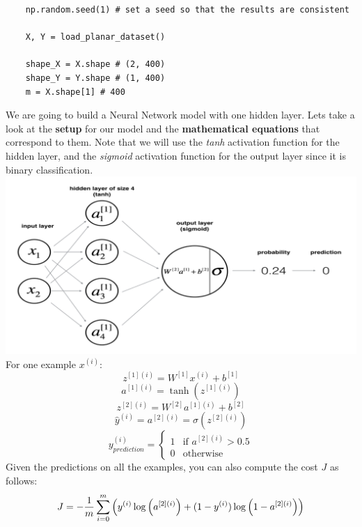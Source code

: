 \documentclass[11pt, a4paper]{article}
\begin{document}
\begin{spacing}{1.1}
\begin{lstlisting}
	np.random.seed(1) # set a seed so that the results are consistent
	
	X, Y = load_planar_dataset()

	shape_X = X.shape # (2, 400)
	shape_Y = Y.shape # (1, 400)
	m = X.shape[1] # 400 \end{lstlisting}
	We are going to build a Neural Network model with one hidden layer. Lets take a look at the \textbf{setup} for our model and the \textbf{mathematical equations} that correspond to them. Note that we will use the \textit{tanh} activation function for the hidden layer, and the \textit{sigmoid} activation function for the output layer since it is binary classification. \\
	\hspace*{27mm} \includegraphics[scale=0.55]{planar_nn} \vspace*{1mm} \\
	For one example $x^{(i)}$: \\
	$$z^{[1] (i)} =  W^{[1]} x^{(i)} + b^{[1]}$$ 
	$$a^{[1] (i)} = \tanh(z^{[1] (i)})$$
	$$z^{[2] (i)} = W^{[2]} a^{[1] (i)} + b^{[2]}$$
	$$\hat{y}^{(i)} = a^{[2] (i)} = \sigma(z^{ [2] (i)})$$
	$$y^{(i)}_{prediction} = \begin{cases} 1 & \mbox{if } a^{[2](i)} > 0.5 \\ 0 & \mbox{otherwise } \end{cases}$$
	\hspace*{4mm} Given the predictions on all the examples, you can also compute the cost $J$ as follows: 
	$$J = - \frac{1}{m} \sum\limits_{i = 0}^{m} \large\left(\small y^{(i)}\log\left(a^{[2] (i)}\right) + (1-y^{(i)})\log\left(1- a^{[2] (i)}\right)  \large  \right) \small$$ \newpage


\end{spacing}
\end{document}
